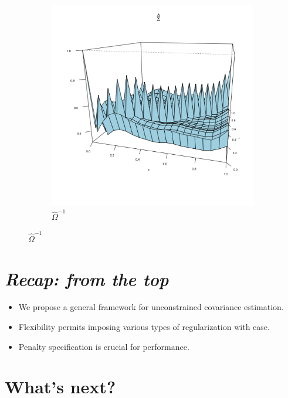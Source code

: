 \documentclass[12pt]{article}
\theoremstyle{definition}
\begin{document}
\begin{center}
\begin{figure}[H]
 \begin{subfigure}{.48\textwidth}
 \includegraphics{img/compound-symmetry-estimated-covariance}
 \caption{$\hat{\Omega}^{-1}$}
 \end{subfigure}
 \end{figure}
     \end{center}


 



 
\section{\emph{Recap: from the top}}

\begin{itemize}
\item We propose a general framework for unconstrained covariance estimation.
\item Flexibility permits imposing various types of regularization with ease. 
\item Penalty specification is crucial for performance.
\end{itemize}

 



 
\section{What's next?}
\end{document}
